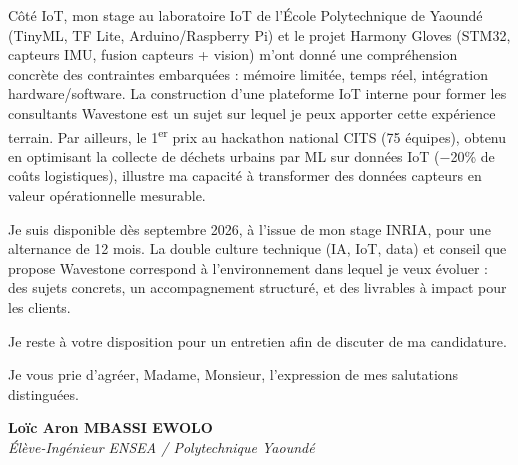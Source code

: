 \documentclass[a4paper,11pt]{article}
\begin{document}
Côté IoT, mon stage au laboratoire IoT de l'École Polytechnique de Yaoundé (TinyML, TF Lite, Arduino/Raspberry Pi) et le projet Harmony Gloves (STM32, capteurs IMU, fusion capteurs + vision) m'ont donné une compréhension concrète des contraintes embarquées : mémoire limitée, temps réel, intégration hardware/software. La construction d'une plateforme IoT interne pour former les consultants Wavestone est un sujet sur lequel je peux apporter cette expérience terrain. Par ailleurs, le 1\textsuperscript{er} prix au hackathon national CITS (75 équipes), obtenu en optimisant la collecte de déchets urbains par ML sur données IoT ($-$20\% de coûts logistiques), illustre ma capacité à transformer des données capteurs en valeur opérationnelle mesurable.

Je suis disponible dès septembre 2026, à l'issue de mon stage INRIA, pour une alternance de 12 mois. La double culture technique (IA, IoT, data) et conseil que propose Wavestone correspond à l'environnement dans lequel je veux évoluer : des sujets concrets, un accompagnement structuré, et des livrables à impact pour les clients.

Je reste à votre disposition pour un entretien afin de discuter de ma candidature.

Je vous prie d'agréer, Madame, Monsieur, l'expression de mes salutations distinguées.

\vspace{0.8cm}

\textbf{Loïc Aron MBASSI EWOLO}\\
\textit{Élève-Ingénieur ENSEA / Polytechnique Yaoundé}
\end{document}

